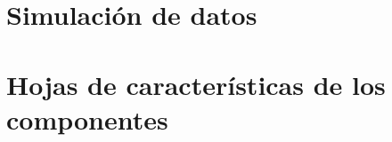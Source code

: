 \documentclass[12pt]{report}
\begin{document}
\begin{appendices}
\newpage
\chapter{Simulación de datos}

\newpage
\chapter{Hojas de características de los componentes}

\newpage
\end{appendices}



\end{document}
